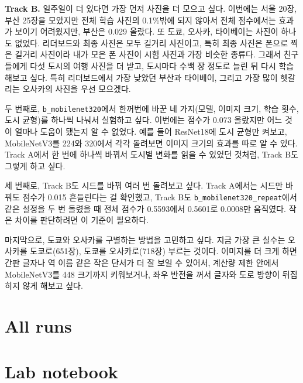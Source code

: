 \documentclass[11pt]{article}
\begin{document}
\textbf{Track B.} 일주일이 더 있다면 가장 먼저 사진을 더 모으고 싶다. 이번에는 서울
20장, 부산 25장을 모았지만 전체 학습 사진의 0.1\%밖에 되지 않아서 전체 점수에서는 효과가
보이기 어려웠지만, 부산은 0.029 올랐다. 또 도쿄, 오사카, 타이베이는 사진이 하나도
없었다. 리더보드와 최종 사진은 모두 길거리 사진이고, 특히 최종 사진은 폰으로 찍은 길거리
사진이라 내가 모은 폰 사진이 시험 사진과 가장 비슷한 종류다. 그래서 친구들에게 다섯 도시의
여행 사진을 더 받고, 도시마다 수백 장 정도로 늘린 뒤 다시 학습해보고 싶다. 특히 리더보드에서
가장 낮았던 부산과 타이베이, 그리고 가장 많이 헷갈리는 오사카의 사진을 우선 모으겠다.

두 번째로, \texttt{b\_mobilenet320}에서 한꺼번에 바꾼 네 가지(모델, 이미지 크기, 학습
횟수, 도시 균형)를 하나씩 나눠서 실험하고 싶다. 이번에는 점수가 0.073 올랐지만 어느 것이
얼마나 도움이 됐는지 알 수 없었다. 예를 들어 ResNet18에 도시 균형만 켜보고, MobileNetV3를
224와 320에서 각각 돌려보면 이미지 크기의 효과를 따로 알 수 있다. Track A에서 한 번에
하나씩 바꿔서 도시별 변화를 읽을 수 있었던 것처럼, Track B도 그렇게 하고 싶다.

세 번째로, Track B도 시드를 바꿔 여러 번 돌려보고 싶다. Track A에서는 시드만 바꿔도
점수가 0.015 흔들린다는 걸 확인했고, Track B도 \texttt{b\_mobilenet320\_repeat}에서 같은
설정을 두 번 돌렸을 때 전체 점수가 0.5593에서 0.5601로 0.0008만 움직였다. 작은 차이를
판단하려면 이 기준이 필요하다.

마지막으로, 도쿄와 오사카를 구별하는 방법을 고민하고 싶다. 지금 가장 큰 실수는 오사카를
도쿄로(651장), 도쿄를 오사카로(718장) 부르는 것이다. 이미지를 더 크게 하면 간판 글자나
역 이름 같은 작은 단서가 더 잘 보일 수 있어서, 계산량 제한 안에서 MobileNetV3를 448
크기까지 키워보거나, 좌우 반전을 꺼서 글자와 도로 방향이 뒤집히지 않게 해보고 싶다.

\section*{All runs}

\section*{Lab notebook}
\end{document}
